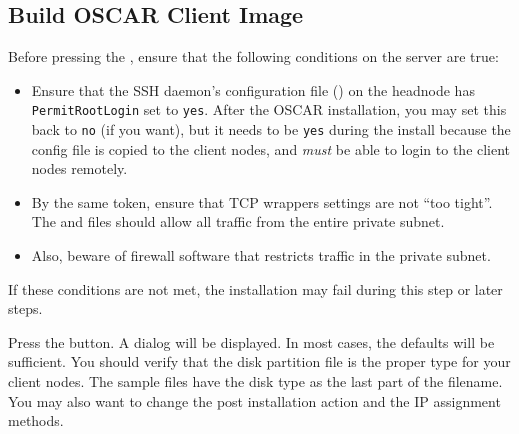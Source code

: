 

\subsection{Build OSCAR Client Image}
\label{det:build-client-image}

Before pressing the , ensure that the
following conditions on the server are true:

\begin{itemize}

\item Ensure that the SSH daemon's configuration file
  () on the headnode has {\tt PermitRootLogin} 
  set to {\tt yes}.  After the OSCAR installation, you may set this back 
  to {\tt no} (if you want), but it needs to be {\tt yes} during the install 
  because the config file is copied to the client nodes, and  
  {\em must} be able to login to the client nodes remotely.

\item By the same token, ensure that TCP wrappers settings are not
  ``too tight''.  The  and  
  files should allow all traffic from the entire private subnet.
  
\item Also, beware of firewall software that restricts traffic in the
  private subnet.
\end{itemize}

If these conditions are not met, the installation may fail during this
step or later steps.

Press the  button. A dialog will be
displayed. In most cases, the defaults will be sufficient. You should
verify that the disk partition file is the proper type for your client
nodes. The sample files have the disk type as the last part of the
filename. You may also want to change the post installation action and
the IP assignment methods.  

